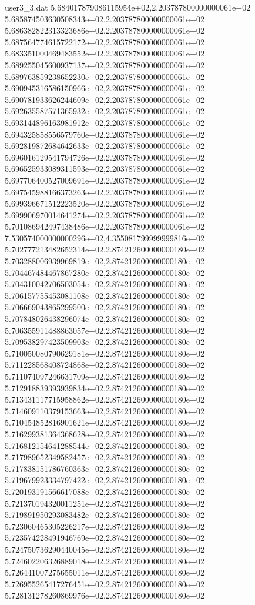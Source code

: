\begin{filecontents}{user3_3.dat}
5.684017879086115954e+02,2.203787800000000061e+02
5.685874503630508343e+02,2.203787800000000061e+02
5.686382822313323686e+02,2.203787800000000061e+02
5.687564774615722172e+02,2.203787800000000061e+02
5.683351000469483552e+02,2.203787800000000061e+02
5.689255045600937137e+02,2.203787800000000061e+02
5.689763859238652230e+02,2.203787800000000061e+02
5.690945316586150966e+02,2.203787800000000061e+02
5.690781933626244609e+02,2.203787800000000061e+02
5.692635587571365932e+02,2.203787800000000061e+02
5.693144896163981912e+02,2.203787800000000061e+02
5.694325858556579760e+02,2.203787800000000061e+02
5.692819872684642633e+02,2.203787800000000061e+02
5.696016129541794726e+02,2.203787800000000061e+02
5.696525933089311593e+02,2.203787800000000061e+02
5.697706400527009691e+02,2.203787800000000061e+02
5.697545988166373263e+02,2.203787800000000061e+02
5.699396671512223520e+02,2.203787800000000061e+02
5.699906970014641274e+02,2.203787800000000061e+02
5.701086942497438486e+02,2.203787800000000061e+02
7.530574000000000296e+02,4.355081799999999816e+02
5.702777213482652314e+02,2.874212600000000180e+02
5.703288006939969819e+02,2.874212600000000180e+02
5.704467484467867280e+02,2.874212600000000180e+02
5.704310042706503054e+02,2.874212600000000180e+02
5.706157755453081108e+02,2.874212600000000180e+02
5.706669043865299500e+02,2.874212600000000180e+02
5.707848026438296074e+02,2.874212600000000180e+02
5.706355911488863057e+02,2.874212600000000180e+02
5.709538297423509903e+02,2.874212600000000180e+02
5.710050080790629181e+02,2.874212600000000180e+02
5.711228568408724868e+02,2.874212600000000180e+02
5.711074097246631709e+02,2.874212600000000180e+02
5.712918839393939834e+02,2.874212600000000180e+02
5.713431117715958862e+02,2.874212600000000180e+02
5.714609110379153663e+02,2.874212600000000180e+02
5.710454852816901621e+02,2.874212600000000180e+02
5.716299381364368628e+02,2.874212600000000180e+02
5.716812154641288544e+02,2.874212600000000180e+02
5.717989652349582457e+02,2.874212600000000180e+02
5.717838151786760363e+02,2.874212600000000180e+02
5.719679923334797422e+02,2.874212600000000180e+02
5.720193191566617088e+02,2.874212600000000180e+02
5.721370194320011251e+02,2.874212600000000180e+02
5.719891950293083482e+02,2.874212600000000180e+02
5.723060465305226217e+02,2.874212600000000180e+02
5.723574228491946769e+02,2.874212600000000180e+02
5.724750736290440045e+02,2.874212600000000180e+02
5.724602206326889018e+02,2.874212600000000180e+02
5.726441007275655011e+02,2.874212600000000180e+02
5.726955265417276451e+02,2.874212600000000180e+02
5.728131278260869976e+02,2.874212600000000180e+02

\end{filecontents}
